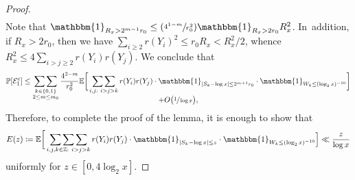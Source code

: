\documentclass[10pt,a4paper]{amsart}
\newcommand{\Psfrac}[2]{(\sfrac{#1}{#2})}
\newcommand{\ZZ}{\mathbb{Z}}
\newcommand{\PP}{\mathbb{P}}
\newcommand{\EE}{\mathbb{E}}
\newcommand{\one}{\mathbbm{1}}
\newcommand{\EC}{\mathcal{E}}
\newcommand{\bg}{\big}
\newcommand{\bgg}{\Big}
\newcommand{\bggg}{\bigg}
\theoremstyle{plain}
\theoremstyle{definition}
\begin{document}
\begin{proof}
\begin{multline*}
\end{multline*}
Note that $\one_{R_x > 2^{m-1}r_0}\le \Psfrac{4^{1-m}}{r_0^2} \one_{R_x>2r_0}R_x^2$. In~addition, if $R_x>2r_0$, then we have $\sum_{i\ge2}r(Y_i)^2\le r_0R_x<R_x^2/2$, whence $R_x^2\le 4\sum_{i>j\ge2}r(Y_i)r(Y_j)$.
We conclude that
\begin{multline*}
\PP[\EC_1^c]\le \mathop{\sum\sum}_{\substack{k\in\{0,1\} \\ 2\le m\le m_0} }
\frac{4^{2-m}}{r_0^2} \EE\bggg[ \mathop{\sum\sum}_{i,j :\ i>j>k}r(Y_i)r(Y_j) \cdot \one_{|S_k-\log x|\le 2^{m+1}r_0} \cdot \one_{W_k \le (\log_2x)^{-10}} \bggg] \\[-10pt]
+O\bg(\sfrac{1}{\log x}\bg),
\end{multline*}
Therefore, to complete the proof of the lemma, it is enough to show that
\begin{equation}
\label{eq:E(z)}
E(z) \coloneqq \EE \bggg[\mathop{\sum\sum\sum}_{\substack{i, j, k \in \ZZ:\ i>j>k}}r(Y_i)r(Y_j) \cdot \one_{|S_k-\log x|\le z} \cdot \one_{W_k \le (\log_2x)^{-10}} \bgg] \ll \frac{z}{\log x}
\end{equation}
uniformly for $z\in[0,4\log_2x]$.


\end{proof}
\end{document}
